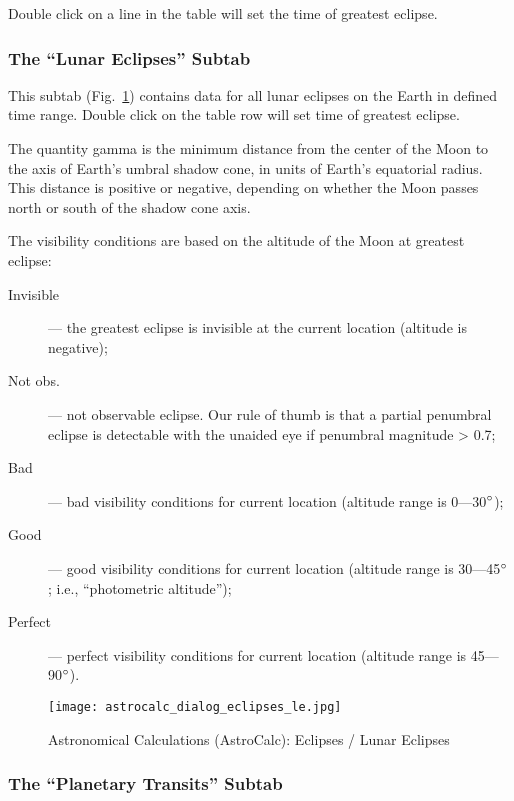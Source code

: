 Double click on a line in the table will set the time of greatest eclipse.


\subsubsection{The ``Lunar Eclipses'' Subtab}
\label{sec:gui:AstroCalc:Eclipses:LunarEclipses}

This subtab (Fig.~\ref{fig:gui:AstroCalc:Eclipses:LunarEclipses}) contains data for all lunar eclipses on the Earth in defined time range.
Double click on the table row will set time of greatest eclipse.

The quantity gamma is the minimum distance from the center of the Moon to the axis of Earth’s umbral shadow cone, in units of Earth’s equatorial radius.
This distance is positive or negative, depending on whether the Moon passes north or south of the shadow cone axis.

The visibility conditions are based on the altitude of the Moon at greatest eclipse:
\begin{description}
  \item[Invisible] --- the greatest eclipse is invisible at the current location (altitude is negative);
  \item[Not obs.] --- not observable eclipse. Our rule of thumb is that a partial penumbral eclipse is detectable with the unaided eye if penumbral magnitude > 0.7;
  \item[Bad] --- bad visibility conditions for current location (altitude range is 0---30$\degree$);
  \item[Good] --- good visibility conditions for current location (altitude range is 30---45$\degree$; i.e., ``photometric altitude'');
  \item[Perfect] --- perfect visibility conditions for current location (altitude range is 45---90$\degree$).
\end{description}

\begin{figure}[tbp]
\centering\texttt{[image: astrocalc\_dialog\_eclipses\_le.jpg]}
\caption{Astronomical Calculations (AstroCalc): Eclipses / Lunar Eclipses}
\label{fig:gui:AstroCalc:Eclipses:LunarEclipses}
\end{figure}


\subsubsection{The ``Planetary Transits'' Subtab}
\label{sec:gui:AstroCalc:Eclipses:PlanetaryTransits}

